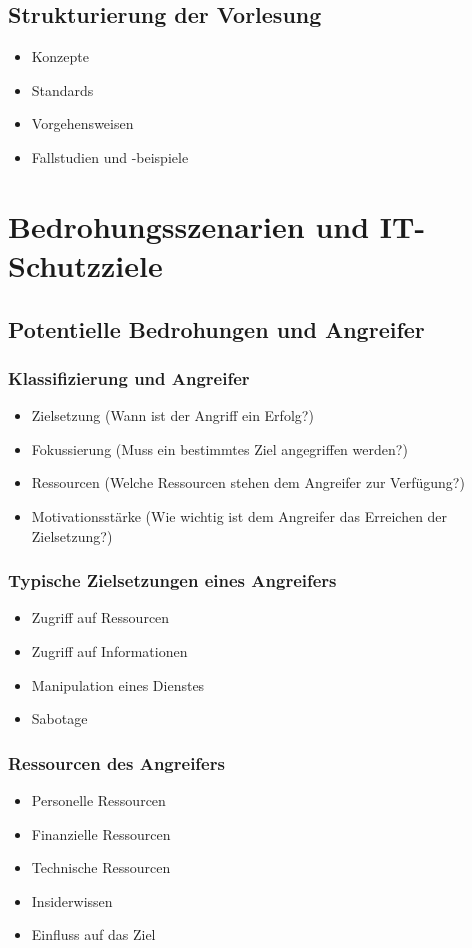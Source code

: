 \subsection{Strukturierung der Vorlesung}
\begin{itemize}
	\item Konzepte
	\item Standards
	\item Vorgehensweisen
	\item Fallstudien und -beispiele
\end{itemize}



\section{Bedrohungsszenarien und IT-Schutzziele}

\subsection{Potentielle Bedrohungen und Angreifer}

\subsubsection{Klassifizierung und Angreifer}
\begin{itemize}
	\item Zielsetzung (Wann ist der Angriff ein Erfolg?)
	\item Fokussierung (Muss ein bestimmtes Ziel angegriffen werden?)
	\item Ressourcen (Welche Ressourcen stehen dem Angreifer zur Verfügung?)
	\item Motivationsstärke (Wie wichtig ist dem Angreifer das Erreichen der Zielsetzung?)
\end{itemize}

\subsubsection{Typische Zielsetzungen eines Angreifers}
\begin{itemize}
	\item Zugriff auf Ressourcen
	\item Zugriff auf Informationen
	\item Manipulation eines Dienstes
	\item Sabotage
\end{itemize}

\subsubsection{Ressourcen des Angreifers}
\begin{itemize}
	\item Personelle Ressourcen
	\item Finanzielle Ressourcen
	\item Technische Ressourcen
	\item Insiderwissen
	\item Einfluss auf das Ziel
\end{itemize}

